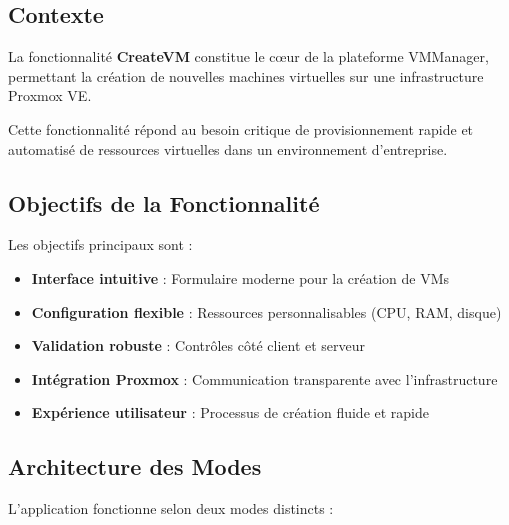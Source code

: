 \documentclass[12pt,a4paper]{report}
\begin{document}
\subsection{Contexte}

La fonctionnalité \textbf{CreateVM} constitue le cœur de la plateforme VMManager, permettant la création de nouvelles machines virtuelles sur une infrastructure Proxmox VE.

Cette fonctionnalité répond au besoin critique de provisionnement rapide et automatisé de ressources virtuelles dans un environnement d'entreprise.

\subsection{Objectifs de la Fonctionnalité}

Les objectifs principaux sont :

\begin{itemize}[leftmargin=2cm]
    \item \textbf{Interface intuitive} : Formulaire moderne pour la création de VMs
    \item \textbf{Configuration flexible} : Ressources personnalisables (CPU, RAM, disque)
    \item \textbf{Validation robuste} : Contrôles côté client et serveur
    \item \textbf{Intégration Proxmox} : Communication transparente avec l'infrastructure
    \item \textbf{Expérience utilisateur} : Processus de création fluide et rapide
\end{itemize}

\subsection{Architecture des Modes}

L'application fonctionne selon deux modes distincts :
\end{document}
